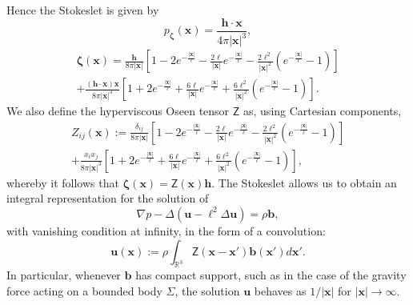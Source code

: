 \documentclass[final]{amsart}
\theoremstyle{definition}
\theoremstyle{definition}
\theoremstyle{remark}
\begin{document}
Hence the Stokeslet is given by
\begin{equation*}
{p_{\boldsymbol{\zeta}}}({\boldsymbol x})=\frac{{\boldsymbol h}\cdot{\boldsymbol x}}{4\pi|{\boldsymbol x}|^3},
\end{equation*}
\begin{multline*}
{\boldsymbol{\zeta}}({\boldsymbol x})=\frac{{\boldsymbol h}}{8\pi |{\boldsymbol x}|}\left[1-2e^{-\frac{|{\boldsymbol x}|}{\ell}}-\frac{2\ell}{|{\boldsymbol x}|}e^{-\frac{|{\boldsymbol x}|}{\ell}}-\frac{2\ell^2}{|{\boldsymbol x}|^2}\left(e^{-\frac{|{\boldsymbol x}|}{\ell}}-1\right)\right]
\\
+\frac{({\boldsymbol h}\cdot{\boldsymbol x}){\boldsymbol x}}{8\pi |{\boldsymbol x}|^3}\left[1+2e^{-\frac{|{\boldsymbol x}|}{\ell}}+\frac{6\ell}{|{\boldsymbol x}|}e^{-\frac{|{\boldsymbol x}|}{\ell}}+\frac{6\ell^2}{|{\boldsymbol x}|^2}\left(e^{-\frac{|{\boldsymbol x}|}{\ell}}-1\right)\right]
.
\end{multline*}
We also define the hyperviscous Oseen tensor ${{\mathsf Z}}$ as, using
Cartesian components,
\begin{multline*}
{Z}_{ij}({\boldsymbol x}):=\frac{\delta_{ij}}{8\pi |{\boldsymbol x}|}\left[1-2e^{-\frac{|{\boldsymbol x}|}{\ell}}-\frac{2\ell}{|{\boldsymbol x}|}e^{-\frac{|{\boldsymbol x}|}{\ell}}-\frac{2\ell^2}{|{\boldsymbol x}|^2}\left(e^{-\frac{|{\boldsymbol x}|}{\ell}}-1\right)\right]
\\
+\frac{x_ix_j}{8\pi |{\boldsymbol x}|^3}\left[1+2e^{-\frac{|{\boldsymbol x}|}{\ell}}+\frac{6\ell}{|{\boldsymbol x}|}e^{-\frac{|{\boldsymbol x}|}{\ell}}+\frac{6\ell^2}{|{\boldsymbol x}|^2}\left(e^{-\frac{|{\boldsymbol x}|}{\ell}}-1\right)\right]
,
\end{multline*}
whereby it follows that ${\boldsymbol{\zeta}}({\boldsymbol x})={{\mathsf Z}}({\boldsymbol x}){\boldsymbol h}$.
The Stokeslet allows us to obtain an integral representation for the
solution of
\begin{equation*}
\nabla p- {\Delta}({\boldsymbol u}-\ell^2{\Delta}{\boldsymbol u})=\rho{\boldsymbol b},
\end{equation*}
with vanishing condition at infinity, in the form of a convolution:
\begin{equation}\label{eq:convol}
{\boldsymbol u}({\boldsymbol x}):=\rho\int_{{\mathbb R}^3} {{\mathsf Z}}({\boldsymbol x}-{\boldsymbol x}'){\boldsymbol b}({\boldsymbol x}')d{\boldsymbol x}'.
\end{equation}
In particular, whenever ${\boldsymbol b}$ has compact support, such as in the
case of the gravity force acting on a bounded body $\Sigma$, the
solution ${\boldsymbol u}$ behaves as $1/|{\boldsymbol x}|$ for $|{\boldsymbol x}|\to \infty$.
\end{document}
